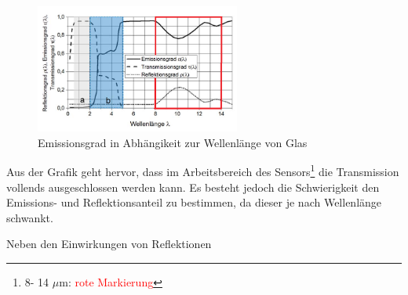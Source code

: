 \begin{figure}[H]
	\centering
	\includegraphics[width=0.6\textwidth]
	{fig/Glas_bearbeitet.png}
	\caption[Emissionsgrad in Abhängikeit zur Wellenlnge]{Emissionsgrad in Abhängikeit zur Wellenlänge von Glas} 
	\label{fig:Glas}	
\end{figure}

Aus der Grafik geht hervor, dass im Arbeitsbereich des Sensors\footnote[8]{ 8- 14 $\mu$m: \textcolor{red}{rote Markierung}} die Transmission vollends ausgeschlossen werden kann. Es besteht jedoch die Schwierigkeit den Emissions- und Reflektionsanteil zu bestimmen, da dieser je nach Wellenlänge schwankt.


Neben den Einwirkungen von Reflektionen 

